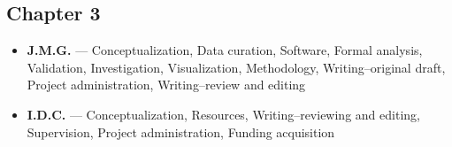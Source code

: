 \documentclass[11pt,a4paper,oneside]{book}
\begin{document}
\begin{doublespace}
\section*{Chapter 3}
\begin{itemize}
\item \textbf{J.M.G.} --- Conceptualization, Data curation, Software, Formal analysis, Validation, Investigation, Visualization, Methodology, Writing--original draft, Project administration, Writing--review and editing
\item \textbf{I.D.C.} --- Conceptualization, Resources, Writing--reviewing and editing, Supervision, Project administration, Funding acquisition
\end{itemize}
\end{doublespace}
\end{document}
